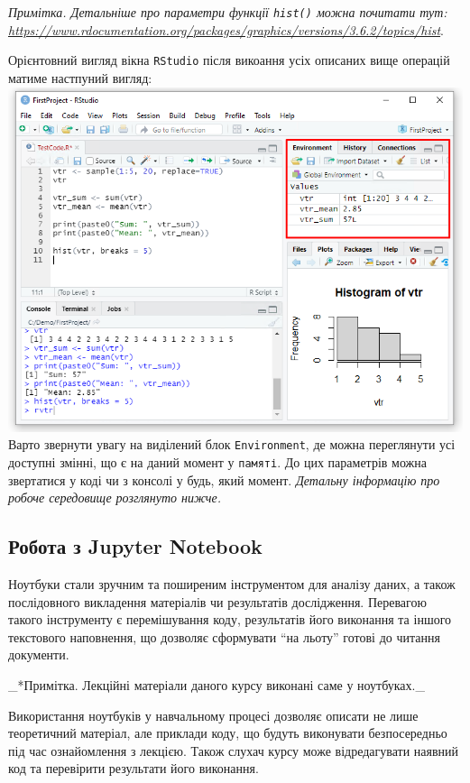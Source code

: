 \documentclass[
]{book}
\begin{document}
\emph{Примітка. Детальніше про параметри функції \texttt{hist()} можна почитати тут: \url{https://www.rdocumentation.org/packages/graphics/versions/3.6.2/topics/hist}}.

Орієнтовний вигляд вікна \texttt{RStudio} після викоання усіх описаних вище операцій матиме настпуний вигляд:
\includegraphics{images/chapter1/rstudio_10.png}
Варто звернути увагу на виділений блок \texttt{Environment}, де можна переглянути усі доступні змінні, що є на даний момент у \texttt{пам\textquotesingle{}яті}. До цих параметрів можна звертатися у коді чи з консолі у будь, який момент. \emph{Детальну інформацію про робоче середовище розглянуто нижче.}

\hypertarget{chapter133}{%
\subsection{Робота з Jupyter Notebook}\label{chapter133}}

Ноутбуки стали зручним та поширеним інструментом для аналізу даних, а також послідовного викладення матеріалів чи результатів дослідження. Перевагою такого інструменту є перемішування коду, результатів його виконання та іншого текстового наповнення, що дозволяє сформувати ``на льоту'' готові до читання документи.

\_*Примітка. Лекційні матеріали даного курсу виконані саме у ноутбуках.\_

Використання ноутбуків у навчальному процесі дозволяє описати не лише теоретичний матеріал, але приклади коду, що будуть виконувати безпосередньо під час ознайомлення з лекцією. Також слухач курсу може відредагувати наявний код та перевірити результати його виконання.
\end{document}
